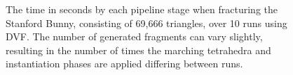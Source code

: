 \begin{figure}[h!]
\caption{The time in seconds by each pipeline stage when fracturing the Stanford Bunny, consisting of 69,666 triangles, over 10 runs using DVF. The number of generated fragments can vary slightly, resulting in the number of times the marching tetrahedra and instantiation phases are applied differing between runs.}
\label{fig:A.2}
\end{figure}

